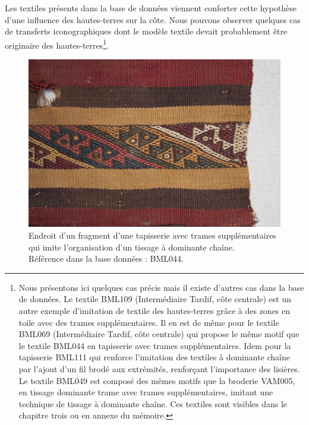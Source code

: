 Les textiles présents dans la base de données viennent conforter cette hypothèse d'une influence des hautes-terres sur la côte. Nous pouvons observer quelques cas de transferts iconographiques dont le modèle textile devait probablement être originaire des hautes-terres\footnote{Nous présentons ici quelques cas précis mais il existe d'autres cas dans la base de données. Le textile BML109 (Intermédiaire Tardif, côte centrale) est un autre exemple d'imitation de textile des hautes-terres grâce à des zones en toile avec des trames supplémentaires. Il en est de même pour le textile BML069 (Intermédiaire Tardif, côte centrale) qui propose le même motif que le textile BML044 en tapisserie avec trames supplémentaires. Idem pour la tapisserie BML111 qui renforce l'imitation des textiles à dominante chaîne par l'ajout d'un fil brodé aux extrémités, renforçant l'importance des lisières. Le textile BML049 est composé des mêmes motifs que la broderie VAM005, en tissage dominante trame avec trames supplémentaires, imitant une technique de tissage à dominante chaîne. Ces textiles sont visibles dans le chapitre trois ou en annexe du mémoire.}.

\begin{figure}[!ht]
       \begin{center}
        		\includegraphics[width=14cm]{../images/BML044_avant.jpg}
	\end{center}
    \caption{Endroit d'un fragment d'une tapisserie avec trames supplémentaires qui imite l'organisation d'un tissage à dominante chaîne. \\ Référence dans la base données : BML044.}
    \label{fig:BML044_avant}
\end{figure}

